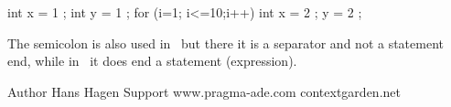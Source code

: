 \starttyping
int x = 1 ;
int y = 1 ;
for (i=1; i<=10;i++) {
    int x = 2 ;
    y = 2 ;
}
\stoptyping

The semicolon is also used in \PASCAL\ but there it is a separator and not a
statement end, while in \METAPOST\ it does end a statement (expression).

\stopsection

\stopsection

\startsubject[title=Colofon]

\starttabulate
\NC Author      \NC Hans Hagen         \NC \NR
\NC \CONTEXT    \NC \contextversion    \NC \NR
\NC \LUAMETATEX \NC \texengineversion  \NC \NR
\NC Support     \NC www.pragma-ade.com \NC \NR
\NC             \NC contextgarden.net  \NC \NR
\stoptabulate

\stopsubject

\stopdocument
